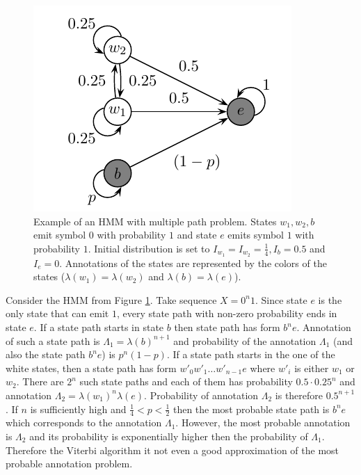 \begin{figure}
\begin{center}
\includegraphics{../figures/multiplePathProblemHMM.pdf}
\end{center}
\caption[Hidden Markov Model with multiple path problem.]{Example of an HMM with
multiple path problem. States $w_1,w_2,b$ emit symbol $0$ with probability $1$
and state $e$ emits symbol $1$ with probability $1$. Initial distribution is set
to $I_{w_1}=I_{w_2}=\frac14, I_{b}=0.5$
and $I_e=0$. Annotations of the states are represented by the colors of the states
($\lambda(w_1)=\lambda(w_2)$ and $\lambda(b)=\lambda(e)$). }\label{FIGURE:BADVITERBIEXAMPLE}
\end{figure}

\begin{example} 
Consider the HMM from Figure \ref{FIGURE:BADVITERBIEXAMPLE}. Take sequence
$X=0^n1$.  Since state $e$ is the only state that can emit $1$, every state
path with non-zero probability ends in state $e$. If a state path starts in
state $b$ then state path has form $b^ne$. Annotation of such a state path is
$\Lambda_1=\lambda(b)^{n+1}$ and probability of the annotation $\Lambda_1$ (and
also the state path $b^ne$) is $p^n(1-p)$.  If a state path starts in the one
of the white states, then a state path has form $w'_0w'_1\dots w'_{n-1}e$ where
$w'_i$ is either $w_1$ or $w_2$.  There are $2^n$ such state paths and each of
them has probability $0.5\cdot 0.25^n$ and annotation
$\Lambda_2=\lambda(w_1)^n\lambda(e)$. Probability of annotation $\Lambda_2$ is
therefore $0.5^{n+1}$.  If $n$ is sufficiently high and $\frac14<p<\frac12$
then the most probable state path is $b^ne$ which corresponds to the annotation
$\Lambda_1$. However, the most probable annotation is $\Lambda_2$ and its
probability is exponentially higher then the probability of $\Lambda_1$.
Therefore the Viterbi algorithm it not even a good approximation of the most
probable annotation problem.

\end{example}


